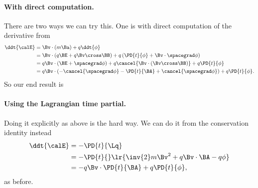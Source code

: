 {\paragraph{With direct computation.}
There are two ways we can try this.  One is with direct computation of the derivative from 
%
\begin{equation}\label{eqn:classicalMechanicsPs2:1150}
\begin{aligned}
\ddt{\calE}
&= \Bv \cdot (m \Ba) + q \ddt{\phi} \\
&= \Bv \cdot \left( q \BE + q \Bv \cross \BB \right) + q \left( \PD{t}{\phi} + \Bv \cdot \spacegrad \phi \right) \\
&= q \Bv \cdot (\BE + \spacegrad \phi) + q \cancel{\Bv \cdot \left(\Bv \cross \BB \right)} + q \PD{t}{\phi} \\
&= q \Bv \cdot \left(-\cancel{\spacegrad \phi} - \PD{t}{\BA} + \cancel{\spacegrad \phi} \right) + q \PD{t}{\phi}.
\end{aligned}
\end{equation}
%
So our end result is
%
%
\paragraph{Using the Lagrangian time partial.}
%
Doing it explicitly as above is the hard way.  We can do it from the conservation identity  instead
%
\begin{equation}\label{eqn:classicalMechanicsPs2:590}
\begin{aligned}
\ddt{\calE}
&= -\PD{t}{\Lq} \\
&= -\PD{t}{} \lr{ \inv{2} m \Bv^2 + q \Bv \cdot \BA - q \phi } \\
&= -q \Bv \cdot \PD{t}{\BA} + q \PD{t}{\phi},
\end{aligned}
\end{equation}
%
as before.
%
}
